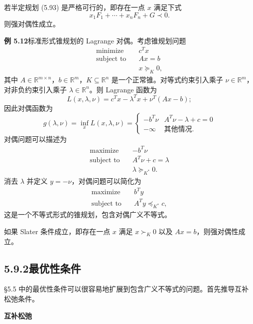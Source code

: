 \documentclass[UTF8, 12pt, fontset=fandol, oneside]{ctexart}
\begin{document}
若半定规划 (5.93) 是严格可行的，即存在一点 $x$ 满足下式
\[
x_1F_1+\cdots+x_nF_n+G\prec 0.
\]
则强对偶性成立。

\noindent\textbf{例 5.12}\quad 标准形式锥规划的 Lagrange 对偶。考虑锥规划问题
\[
\begin{aligned}
\text{minimize}\quad & c^Tx\\
\text{subject to}\quad & Ax=b\\
& x\succeq_K 0,
\end{aligned}
\]
其中 $A\in\mathbb{R}^{m\times n}$，$b\in\mathbb{R}^m$，$K\subseteq\mathbb{R}^n$ 是一个正常锥。对等式约束引入乘子 $\nu\in\mathbb{R}^m$，对非负约束引入乘子 $\lambda\in\mathbb{R}^n$。则 Lagrange 函数为
\[
L(x,\lambda,\nu)=c^Tx-\lambda^Tx+\nu^T(Ax-b);
\]
因此对偶函数为
\[
g(\lambda,\nu)=\inf_x L(x,\lambda,\nu)=
\begin{cases}
-b^T\nu & A^T\nu-\lambda+c=0\\
-\infty & \text{其他情况}.
\end{cases}
\]
对偶问题可以描述为
\[
\begin{aligned}
\text{maximize}\quad & -b^T\nu\\
\text{subject to}\quad & A^T\nu+c=\lambda\\
& \lambda\succeq_{K^\ast}0.
\end{aligned}
\]
消去 $\lambda$ 并定义 $y=-\nu$，对偶问题可以简化为
\[
\begin{aligned}
\text{maximize}\quad & b^Ty\\
\text{subject to}\quad & A^Ty\preceq_{K^\ast}c,
\end{aligned}
\]
这是一个不等式形式的锥规划，包含对偶广义不等式。

如果 Slater 条件成立，即存在一点 $x$ 满足 $x\succ_K0$ 以及 $Ax=b$，则强对偶性成立。

\subsection*{5.9.2\quad 最优性条件}

§5.5 中的最优性条件可以很容易地扩展到包含广义不等式的问题。首先推导互补松弛条件。

\noindent\textbf{互补松弛}
\end{document}
